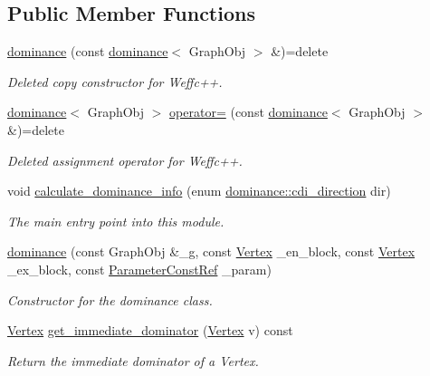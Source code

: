 \subsection*{Public Member Functions}
\begin{DoxyCompactItemize}
\item 
\hyperlink{classdominance_a2a4b902f1d46646f6471991088c6d9f4}{dominance} (const \hyperlink{classdominance}{dominance}$<$ Graph\+Obj $>$ \&)=delete
\begin{DoxyCompactList}\small\item\em Deleted copy constructor for Weffc++. \end{DoxyCompactList}\item 
\hyperlink{classdominance}{dominance}$<$ Graph\+Obj $>$ \hyperlink{classdominance_a1c7f50c3b50939b22ecde9bc0ffcb28d}{operator=} (const \hyperlink{classdominance}{dominance}$<$ Graph\+Obj $>$ \&)=delete
\begin{DoxyCompactList}\small\item\em Deleted assignment operator for Weffc++. \end{DoxyCompactList}\item 
void \hyperlink{classdominance_aa440a4fa5c2acfd83163152f5063465b}{calculate\+\_\+dominance\+\_\+info} (enum \hyperlink{classdominance_a983b27e93af6a5d375c01d81c2c30c40}{dominance\+::cdi\+\_\+direction} dir)
\begin{DoxyCompactList}\small\item\em The main entry point into this module. \end{DoxyCompactList}\item 
\hyperlink{classdominance_a002f9eab77b6a52a9e3896a881710229}{dominance} (const Graph\+Obj \&\+\_\+g, const \hyperlink{classdominance_acc73faf26e73171b15fd0ff6c63ca393}{Vertex} \+\_\+en\+\_\+block, const \hyperlink{classdominance_acc73faf26e73171b15fd0ff6c63ca393}{Vertex} \+\_\+ex\+\_\+block, const \hyperlink{Parameter_8hpp_a37841774a6fcb479b597fdf8955eb4ea}{Parameter\+Const\+Ref} \+\_\+param)
\begin{DoxyCompactList}\small\item\em Constructor for the dominance class. \end{DoxyCompactList}\item 
\hyperlink{classdominance_acc73faf26e73171b15fd0ff6c63ca393}{Vertex} \hyperlink{classdominance_abe0394af57bb3d7bf5ce14330c1c7085}{get\+\_\+immediate\+\_\+dominator} (\hyperlink{classdominance_acc73faf26e73171b15fd0ff6c63ca393}{Vertex} v) const
\begin{DoxyCompactList}\small\item\em Return the immediate dominator of a Vertex. \end{DoxyCompactList}\item 

\end{DoxyCompactItemize}
